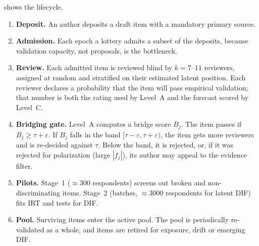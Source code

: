  shows the lifecycle.
\begin{enumerate}
  \item \textbf{Deposit.} An author deposits a draft item with a mandatory primary source.
  \item \textbf{Admission.} Each epoch a lottery admits a subset of the deposits, because
    validation capacity, not proposals, is the bottleneck.
  \item \textbf{Review.} Each admitted item is reviewed blind by $k=7$--$11$ reviewers,
    assigned at random and stratified on their estimated latent position. Each reviewer
    declares a probability that the item will pass empirical validation; that number is both
    the rating used by Level~A and the forecast scored by Level~C.
  \item \textbf{Bridging gate.} Level~A computes a bridge score $B_j$. The item passes if
    $B_j\ge\tau+\varepsilon$. If $B_j$ falls in the band $[\tau-\varepsilon,\tau+\varepsilon)$,
    the item gets more reviewers and is re-decided against $\tau$. Below the band, it is
    rejected, or, if it was rejected for polarization (large $|f_j|$), its author may appeal
    to the evidence filter.
  \item \textbf{Pilots.} Stage~1 ($\approx300$ respondents) screens out broken and
    non-discriminating items. Stage~2 (batches, $\approx3000$ respondents for latent DIF)
    fits IRT and tests for DIF.
  \item \textbf{Pool.} Surviving items enter the active pool. The pool is periodically
    re-validated as a whole, and items are retired for exposure, drift or emerging DIF.
\end{enumerate}

